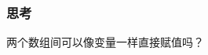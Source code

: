 
\begin{frame}[fragile]
    \frametitle{思考}

    \begin{block}{}
        \vspace{.5cm}
        \begin{center}
            两个数组间可以像变量一样直接赋值吗？
        \end{center}
        \vspace{.5cm}
    \end{block}
\end{frame}

